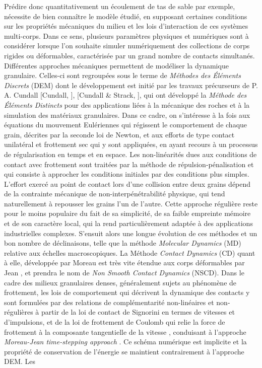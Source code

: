 Prédire donc quantitativement un écoulement de tas de sable par exemple, nécessite de bien connaître le modèle étudié, en supposant certaines conditions sur les propriétés mécaniques du milieu et les lois d'interaction de ces systèmes multi-corps. Dans ce sens, plusieurs paramètres physiques et numériques sont à considérer lorsque l'on souhaite simuler numériquement des collections de corps rigides ou déformables, caractérisée par un grand nombre de contacts simultanés.\\

Différentes approches mécaniques permettent de modéliser la dynamique granulaire. Celles-ci sont regroupées sous le terme de \textit{Méthodes des Éléments Discrets} (DEM) dont le développement est initié par les travaux précurseurs de P. A. Cundall [Cundall, \cite{cundall1971measurement}], [Cundall \& Strack, \cite{cundall1979discrete}], qui ont développé la \textit{Méthode des Éléments Distincts} pour des applications liées à la mécanique des roches et à la simulation des matériaux granulaires. Dans ce cadre, on s'intéresse à la fois aux équations du mouvement Eulériennes qui régissent le comportement de chaque grain, décrites par la seconde loi de Newton, et aux efforts de type contact unilatéral et frottement sec qui y sont appliquées, en ayant recours à un processus de régularisation en temps  et en espace. Les non-linéarités dues aux conditions de contact avec frottement sont traitées par la méthode de répulsion-pénalisation et qui consiste à approcher les conditions initiales par des conditions plus simples. L'effort exercé au point de contact lors d'une collision entre deux grains dépend de la contrainte mécanique de non-interpénétrabilité physique, qui tend naturellement à repousser les grains l'un de l'autre. Cette approche régulière reste pour le moins populaire du fait de sa simplicité, de sa faible empreinte mémoire et de son caractère local, qui la rend particulièrement adaptée à des applications industrielles complexes. S'ensuit alors une longue évolution de ces méthodes et un bon nombre de déclinaisons, telle que la méthode \textit{Molecular Dynamics} (MD) \cite{alder1958prigogine,alder1999molecular,alder1960studies} relative aux échelles macroscopiques. La Méthode \textit{Contact Dynamics} (CD) quant à elle, développée par Moreau \cite{jean1992unilaterality, moreau1977application, moreau1988unilateral, moreau1994numerical, moreau1999sweeping} est très vite étendue aux corps déformables par Jean \cite{jean1999non}, et prendra le nom de \textit{Non Smooth Contact Dynamics} (NSCD). Dans le cadre des milieux granulaires denses, généralement sujets au phénomène de frottement, les lois de comportement qui décrivent la dynamique des contacts y sont formulées par des relations de complémentarité non-linéaires et non-régulières à partir de la loi de contact de Signorini en termes de vitesses et d'impulsions, et de la loi de frottement de Coulomb qui relie la force de frottement à la composante tangentielle de la vitesse \cite{desplanques2015amontons}, conduisant à l'approche \textit{Moreau-Jean time-stepping approach} \cite{moreau1994numerical}. Ce schéma numérique est implicite et la propriété de conservation de l'énergie se maintient contrairement à l'approche DEM. Les 